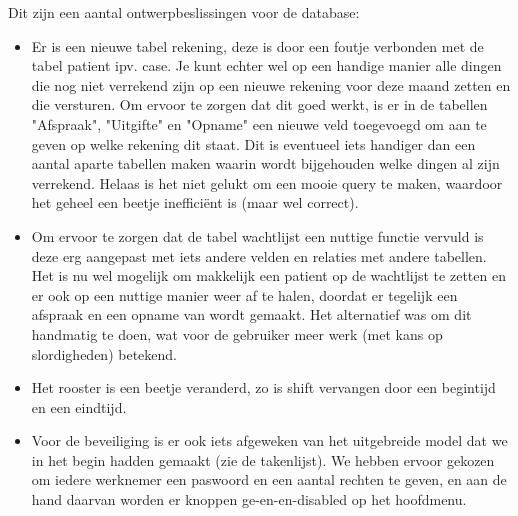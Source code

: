 Dit zijn een aantal ontwerpbeslissingen voor de database:
\begin{itemize}
\item Er is een nieuwe tabel rekening, deze is door een foutje 
	verbonden met de tabel patient ipv. case. Je kunt echter wel op een 
	handige manier alle dingen die nog niet verrekend zijn op een nieuwe
	rekening voor deze maand zetten en die versturen. Om ervoor te 
	zorgen dat dit goed werkt, is er in de tabellen "Afspraak", 
	"Uitgifte" en "Opname" een nieuwe veld toegevoegd om aan te geven
	op welke rekening dit staat. Dit is eventueel iets handiger dan een
   aantal aparte tabellen maken waarin wordt bijgehouden welke dingen al
   zijn verrekend. Helaas is het niet gelukt om een mooie query te maken,
   waardoor het geheel een beetje ineffici\"ent is (maar wel correct).

\item Om ervoor te zorgen dat de tabel wachtlijst een nuttige functie 
	vervuld is deze erg aangepast met iets andere velden en relaties met 
   andere tabellen. Het is nu wel mogelijk om makkelijk een patient op de
   wachtlijst te zetten en er ook op een nuttige manier weer af te halen,
   doordat er tegelijk een afspraak en een opname van wordt gemaakt. Het
   alternatief was om dit handmatig te doen, wat voor de gebruiker meer
   werk (met kans op slordigheden) betekend.

\item Het rooster is een beetje veranderd, zo is shift vervangen door een
	begintijd en een eindtijd.

\item Voor de beveiliging is er ook iets afgeweken van het uitgebreide
   model dat we in het begin hadden gemaakt (zie de takenlijst). We hebben
   ervoor gekozen om iedere werknemer een paswoord en een aantal rechten te 
   geven, en aan de hand daarvan worden er knoppen ge-en-en-disabled op het
   hoofdmenu.

\end{itemize}

